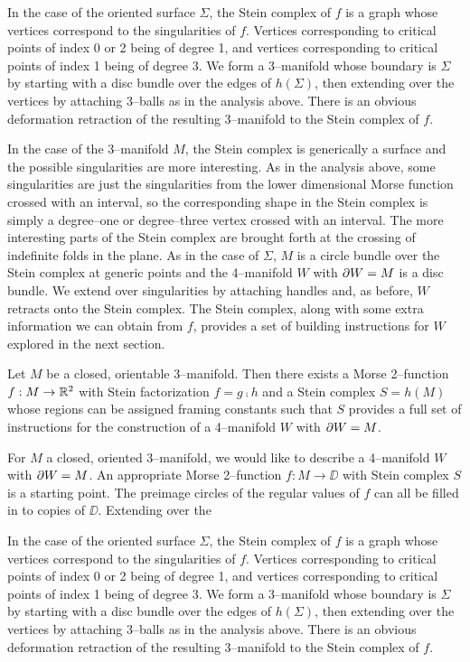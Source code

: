 In the case of the oriented surface $\Sigma$, the Stein complex of $f$ is a graph whose vertices correspond to the singularities of $f$.
Vertices corresponding to critical points of index 0 or 2 being of degree 1, and vertices corresponding to critical points of index 1 being of degree 3.
We form a 3--manifold whose boundary is $\Sigma$ by starting with a disc bundle over the edges of $h(\Sigma)$, then extending over the vertices by attaching 3--balls as in the analysis above.
There is an obvious deformation retraction of the resulting 3--manifold to the Stein complex of $f$.

In the case of the 3--manifold $M$, the Stein complex is generically a surface and the possible singularities are more interesting.
As in the analysis above, some singularities are just the singularities from the lower dimensional Morse function crossed with an interval, so the corresponding shape in the Stein complex is simply a degree--one or degree--three vertex crossed with an interval.
The more interesting parts of the Stein complex are brought forth at the crossing of indefinite folds in the plane.
As in the case of $\Sigma$, $M$ is a circle bundle over the Stein complex at generic points and the 4--manifold $W$ with $\partial W = M$ is a disc bundle.
We extend over singularities by attaching handles and, as before, $W$ retracts onto the Stein complex.
The Stein complex, along with some extra information we can obtain from $f$, provides a set of building instructions for $W$ explored in the next section.

\begin{cor}
	\label{cor:3stein4}
	Let $M$ be a closed, orientable 3--manifold.
	Then there exists a Morse 2--function $f:M\to\mathbb{R}^2$ with Stein factorization $f=g\comp h$ and a Stein complex $S=h(M)$ whose regions can be assigned framing constants such that $S$ provides a full set of instructions for the construction of a 4--manifold $W$ with $\partial W=M$.
\end{cor}







For $M$ a closed, oriented 3--manifold, we would like to describe a 4--manifold $W$ with $\partial W=M$.
An appropriate Morse 2--function $f:M\to\DD$ with Stein complex $S$ is a starting point.
The preimage circles of the regular values of $f$ can all be filled in to copies of $\DD$.
Extending over the 

In the case of the oriented surface $\Sigma$, the Stein complex of $f$ is a graph whose vertices correspond to the singularities of $f$.
Vertices corresponding to critical points of index 0 or 2 being of degree 1, and vertices corresponding to critical points of index 1 being of degree 3.
We form a 3--manifold whose boundary is $\Sigma$ by starting with a disc bundle over the edges of $h(\Sigma)$, then extending over the vertices by attaching 3--balls as in the analysis above.
There is an obvious deformation retraction of the resulting 3--manifold to the Stein complex of $f$.

